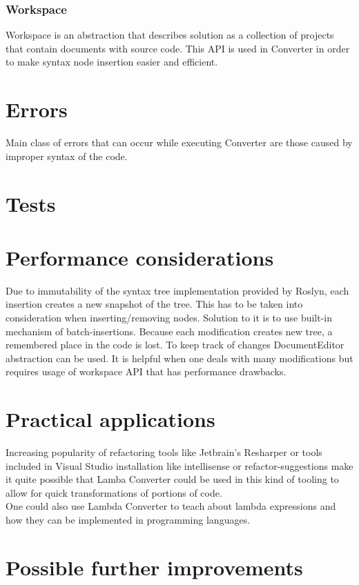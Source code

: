 \documentclass[]{report}
\begin{document}
    \subsubsection{Workspace}
    Workspace is an abstraction that describes solution as a collection of projects that contain documents with source code. This API is used in Converter in order to make syntax node insertion easier and efficient.
    

    \section{Errors}
    Main class of errors that can occur while executing Converter are those caused by improper syntax of the code.  
    
    \section{Tests}
    
    
    
    
    \section{Performance considerations}
    Due to immutability of the syntax tree implementation provided by Roslyn, each insertion creates a new snapshot of the tree. This has to be taken into consideration when inserting/removing nodes. Solution to it is to use built-in mechanism of batch-insertions. Because each modification creates new tree, a remembered place in the code is lost. To keep track of changes DocumentEditor abstraction can be used. It is helpful when one deals with many modifications but requires usage of workspace API that has performance drawbacks.
    
    \section{Practical applications}
    Increasing popularity of refactoring tools like Jetbrain's Resharper or tools included in Visual Studio installation like intellisense or refactor-suggestions make it quite possible that Lamba Converter could be used in this kind of tooling to allow for quick transformations of portions of code.
    \\
    One could also use Lambda Converter to teach about lambda expressions and how they can be implemented in programming languages.
    
    \section{Possible further improvements}
\end{document}
